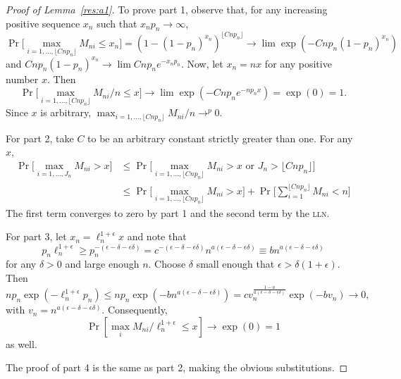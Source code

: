 \documentclass[11pt]{article}
\theoremstyle{definition}
\DeclareMathOperator{\pr}{Pr}
\newcommand{\lln}{\textsc{lln}}
\begin{document}
\begin{proof}[Proof of Lemma~\ref{res:a1}]
  To prove part 1, observe that, for any increasing positive sequence
  $x_n$ such that $x_n p_n \to \infty$,
  \begin{equation*}
    \pr\Big[\max_{i=1,\dots, \lfloor C n p_n \rfloor} M_{ni} \leq x_n\Big] =
    (1 - (1 - p_n)^{x_n})^{\lfloor C n p_n \rfloor} \to \lim \exp(-C n p_n (1 - p_n)^{x_n})
  \end{equation*}
  and $C n p_n (1 - p_n)^{x_n} \to \lim C n p_n e^{-x_n p_n}$. Now, let
  $x_n = n x$ for any positive number $x$.  Then
  \begin{equation*}
    \pr\Big[\max_{i=1,\dots,\lfloor C n p_n \rfloor} M_{ni}/n \leq x \Big] \to
    \lim \exp(-C n p_n e^{-n p_n x}) =
    \exp(0) = 1.
  \end{equation*}
  Since $x$ is arbitrary, $\max_{i=1,\dots,\lfloor C n p_n \rfloor} M_{ni} / n \to^p 0$.

  For part 2, take $C$ to be an arbitrary constant strictly greater
  than one. For any $x$,
  \begin{align*}
    \pr\Big[\max_{i=1,\dots,J_n} M_{ni} > x\Big] & \leq
    \pr\Big[\max_{i=1,\dots,\lfloor C n p_n \rfloor} M_{ni} > x \text{ or
    } J_n > \lfloor C n p_n \rfloor\Big] \\
    & \leq \pr\Big[\max_{i=1,\dots,\lfloor C n p_n \rfloor} M_{ni} > x\Big]
    + \pr\Big[\sum\nolimits_{i=1}^{\lfloor C n
      p_n \rfloor} M_{ni} < n \Big]
  \end{align*}
  The first term converges to zero by part 1 and the second term by
  the \lln.

  For part 3, let $x_n = \ell_n^{1 + \epsilon} x$ and note that 
  \begin{equation*}
    p_n \ell_n^{1+\epsilon} \geq p_n^{-(\epsilon-\delta-\epsilon\delta)} =
    c^{-(\epsilon-\delta-\epsilon\delta)}
    n^{a(\epsilon-\delta-\epsilon\delta)} \equiv b n^{a(\epsilon
      - \delta - \epsilon\delta)}
  \end{equation*}
  for any $\delta > 0$ and large enough $n$.  Choose $\delta$ small
  enough that $\epsilon > \delta(1 +\epsilon)$. Then
  \begin{equation*}
    n p_n \exp(-\ell_n^{1+\epsilon} p_n) \leq n p_n
    \exp(-b n^{a(\epsilon -
      \delta - \epsilon\delta)}) = c
    v_n^{\frac{1-a}{a(\epsilon-\delta-\epsilon\delta)}}
    \exp(-b v_n) \to 0,
  \end{equation*}
  with $v_n = n^{a(\epsilon-\delta-\epsilon\delta)}$.  Consequently,
  \begin{equation*}
    \pr[\max_i M_{ni}/\ell_n^{1+\epsilon} \leq x ] \to \exp(0) = 1
  \end{equation*}
  as well.  

  The proof of part 4 is the same as part 2, making the obvious
  substitutions.
\end{proof}
\end{document}

